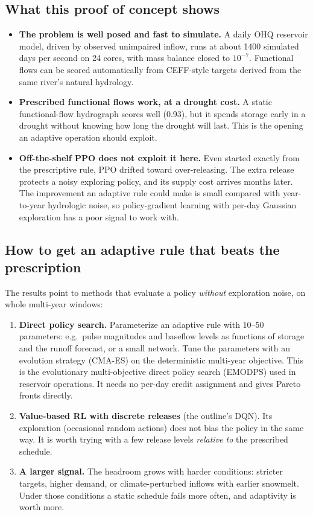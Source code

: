 \subsection*{What this proof of concept shows}
\begin{itemize}
\item \textbf{The problem is well posed and fast to simulate.} A daily
  OHQ reservoir model, driven by observed unimpaired inflow, runs at
  about 1400 simulated days per second on 24 cores, with mass balance
  closed to $10^{-7}$. Functional flows can be scored automatically from
  CEFF-style targets derived from the same river's natural hydrology.
\item \textbf{Prescribed functional flows work, at a drought cost.} A
  static functional-flow hydrograph scores well (0.93), but it spends
  storage early in a drought without knowing how long the drought will
  last. This is the opening an adaptive operation should exploit.
\item \textbf{Off-the-shelf PPO does not exploit it here.} Even started
  exactly from the prescriptive rule, PPO drifted toward over-releasing.
  The extra release protects a noisy exploring policy, and its supply
  cost arrives months later. The improvement an adaptive rule could make
  is small compared with year-to-year hydrologic noise, so policy-gradient
  learning with per-day Gaussian exploration has a poor signal to work
  with.
\end{itemize}

\subsection*{How to get an adaptive rule that beats the prescription}
The results point to methods that evaluate a policy \emph{without}
exploration noise, on whole multi-year windows:
\begin{enumerate}
\item \textbf{Direct policy search.} Parameterize an adaptive rule with
  10--50 parameters: e.g.\ pulse magnitudes and baseflow levels as
  functions of storage and the runoff forecast, or a small network. Tune
  the parameters with an evolution strategy (CMA-ES) on the deterministic
  multi-year objective. This is the evolutionary multi-objective direct
  policy search (EMODPS) used in reservoir operations. It needs no
  per-day credit assignment and gives Pareto fronts directly.
\item \textbf{Value-based RL with discrete releases} (the outline's DQN).
  Its exploration (occasional random actions) does not bias the policy in
  the same way. It is worth trying with a few release levels \emph{relative
  to} the prescribed schedule.
\item \textbf{A larger signal.} The headroom grows with harder conditions:
  stricter targets, higher demand, or climate-perturbed inflows with
  earlier snowmelt. Under those conditions a static schedule fails more
  often, and adaptivity is worth more.
\end{enumerate}
